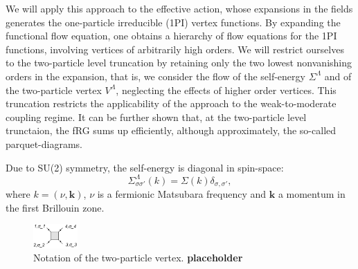 We will apply this approach to the effective action, whose expansions in the fields generates the one-particle irreducible (1PI) vertex functions. By expanding the functional flow equation,\cite{Wetterich1993} one obtains a hierarchy of flow equations for the 1PI functions, involving vertices of arbitrarily  high orders. 
We will restrict ourselves to the two-particle level truncation by retaining only the two lowest nonvanishing orders in the expansion, that is, we consider the flow of the self-energy $\Sigma^\Lambda$ and of the two-particle vertex $V^\Lambda$, neglecting the effects of higher order vertices. 
This truncation restricts the applicability of the approach to the weak-to-moderate coupling regime.\cite{Salmhofer2001} 
It can be further shown that, at the two-particle level trunctaion, the fRG sums up efficiently, although approximately, the so-called parquet-diagrams.\cite{Kugler2017}
  
Due to SU(2) symmetry, the self-energy is diagonal in spin-space: 
\begin{equation}
\Sigma^\Lambda_{\sigma\sigma'}(k)=\Sigma(k)\delta_{\sigma,\sigma'}, 
\end{equation}
where $k=(\nu,\mathbf{k})$, $\nu$ is a fermionic Matsubara frequency and $\mathbf{k}$ a momentum in the first Brillouin zone. 
\begin{figure}
\includegraphics[width=0.15\textwidth]{images/VertexBox.png}
\caption{Notation of the two-particle vertex. \textbf{placeholder}
} 
\label{fig:notvert} 
\end{figure}


